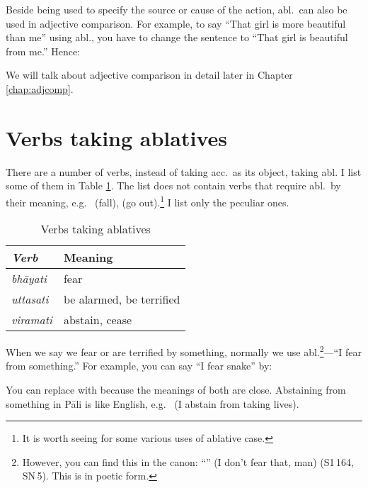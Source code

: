 Beside being used to specify the source or cause of the action, abl.\ can also be used in adjective comparison. For example, to say ``That girl is more beautiful than me'' using abl., you have to change the sentence to ``That girl is beautiful from me.'' Hence:


We will talk about adjective comparison in detail later in Chapter \ref{chap:adjcomp}.

{}
\section*{Verbs taking ablatives}\label{sec:ablverbs}

There are a number of verbs, instead of taking acc.\ as its object, taking abl. I list some of them in Table \ref{tab:ablverb}. The list does not contain verbs that require abl.\ by their meaning, e.g.\  (fall),  (go out).\footnote{It is worth seeing \citealp[pp.~90--2]{warder:intro} for some various uses of ablative case.} I list only the peculiar ones.

\begin{table}[!hbt]
\centering
\caption{Verbs taking ablatives}
\label{tab:ablverb}
\bigskip
\begin{tabular}{>{\itshape}ll} \toprule
\bfseries\upshape Verb & \bfseries Meaning \\ \midrule
bh\=ayati & fear \\
uttasati & be alarmed, be terrified \\
viramati & abstain, cease \\
\bottomrule
\end{tabular}
\end{table}

When we say we fear or are terrified by something, normally we use abl.\footnote{However, you can find this in the canon: ``'' (I don't fear that, man) (S1\,164, SN\,5). This is in poetic form.}---``I fear from something.'' For example, you can say ``I fear snake'' by:


You can replace  with  because the meanings of both are close. Abstaining from something in P\=ali is like English, e.g.\  (I abstain from taking lives).

